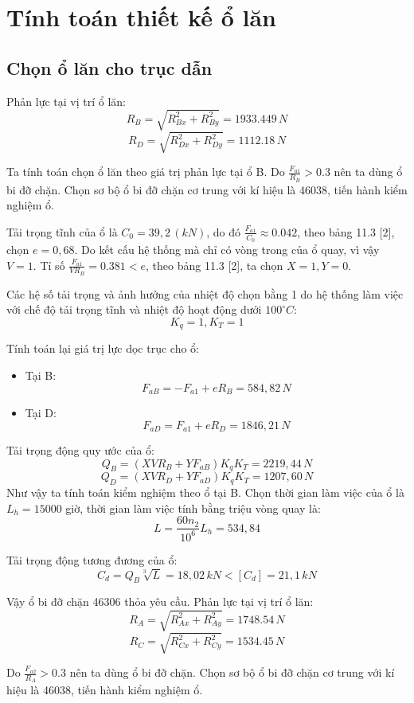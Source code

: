 \chapter{Tính toán thiết kế ổ lăn}
\section{Chọn ổ lăn cho trục dẫn}

\noindent Phản lực tại vị trí ổ lăn:
$$ R_B = \sqrt{R_{Bx}^2 + R_{By}^2} = 1933.449 \, N $$
$$ R_D = \sqrt{R_{Dx}^2 + R_{Dy}^2} = 1112.18 \, N $$

\noindent Ta tính toán chọn ổ lăn theo giá trị phản lực tại ổ B. Do $\frac{F_{a1}}{R_B} > 0.3$ nên ta dùng ổ bi đỡ chặn. Chọn sơ bộ ổ bi đỡ chặn cơ trung với kí hiệu là 46038, tiến hành kiểm nghiệm ổ.

\noindent Tải trọng tĩnh của ổ là $C_0 = 39,2 \, (kN)$, do đó $\frac{F_{a1}}{C_0} \approx 0.042$, theo bảng 11.3 [2], chọn $e = 0,68$. Do kết cấu hệ thống mà chỉ có vòng trong của ổ quay, vì vậy $V = 1$. Tỉ số $\frac{F_{a1}}{VR_B} = 0.381 < e$, theo bảng 11.3 [2], ta chọn $X = 1, Y = 0$.

\noindent Các hệ số tải trọng và ảnh hưởng của nhiệt độ chọn bằng 1 do hệ thống làm việc với chế độ tải trọng tĩnh và nhiệt độ hoạt động dưới $100^\circ C$:
$$ K_q = 1, K_T = 1 $$

\noindent Tính toán lại giá trị lực dọc trục cho ổ:
\begin{itemize}
    \item Tại B:
    $$ F_{aB} = -F_{a1} + eR_B = 584,82 \, N $$
    \item Tại D:
    $$ F_{aD} = F_{a1} + eR_D = 1846,21 \, N $$
\end{itemize}

\noindent Tải trọng động quy ước của ổ:
$$ Q_B = (XVR_B + YF_{aB})K_qK_T = 2219,44 \, N $$
$$ Q_D = (XVR_D + YF_{aD})K_qK_T = 1207,60 \, N $$
\noindent Như vậy ta tính toán kiểm nghiệm theo ổ tại B. Chọn thời gian làm việc của ổ là $L_h = 15000$ giờ, thời gian làm việc tính bằng triệu vòng quay là:
$$ L = \frac{60n_2}{10^6} L_h = 534,84 $$

\noindent Tải trọng động tương đương của ổ:
$$ C_d = Q_B \sqrt[3]{L} = 18,02 \, kN < [C_d] = 21,1 \, kN $$

\noindent Vậy ổ bi đỡ chặn 46306 thỏa yêu cầu.
\noindent Phản lực tại vị trí ổ lăn:
$$ R_A = \sqrt{R_{Ax}^2 + R_{Ay}^2} = 1748.54 \, N $$
$$ R_C = \sqrt{R_{Cx}^2 + R_{Cy}^2} = 1534.45 \, N $$

\noindent Do $\frac{F_{a2}}{R_A} > 0.3$ nên ta dùng ổ bi đỡ chặn. Chọn sơ bộ ổ bi đỡ chặn cơ trung với kí hiệu là 46038, tiến hành kiểm nghiệm ổ.

